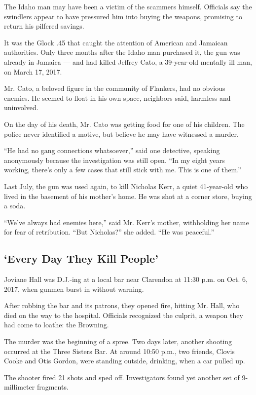 The Idaho man may have been a victim of the scammers himself. Officials
say the swindlers appear to have pressured him into buying the weapons,
promising to return his pilfered savings.

It was the Glock .45 that caught the attention of American and Jamaican
authorities. Only three months after the Idaho man purchased it, the gun
was already in Jamaica --- and had killed Jeffrey Cato, a 39-year-old
mentally ill man, on March 17, 2017.

Mr. Cato, a beloved figure in the community of Flankers, had no obvious
enemies. He seemed to float in his own space, neighbors said, harmless
and uninvolved.

On the day of his death, Mr. Cato was getting food for one of his
children. The police never identified a motive, but believe he may have
witnessed a murder.

``He had no gang connections whatsoever,'' said one detective, speaking
anonymously because the investigation was still open. ``In my eight
years working, there's only a few cases that still stick with me. This
is one of them.''

Last July, the gun was used again, to kill Nicholas Kerr, a quiet
41-year-old who lived in the basement of his mother's home. He was shot
at a corner store, buying a soda.

``We've always had enemies here,'' said Mr. Kerr's mother, withholding
her name for fear of retribution. ``But Nicholas?'' she added. ``He was
peaceful.''

\hypertarget{every-day-they-kill-people}{%
\subsection{`Every Day They Kill
People'}\label{every-day-they-kill-people}}

Joviane Hall was D.J.-ing at a local bar near Clarendon at 11:30 p.m. on
Oct. 6, 2017, when gunmen burst in without warning.

After robbing the bar and its patrons, they opened fire, hitting Mr.
Hall, who died on the way to the hospital. Officials recognized the
culprit, a weapon they had come to loathe: the Browning.

The murder was the beginning of a spree. Two days later, another
shooting occurred at the Three Sisters Bar. At around 10:50 p.m., two
friends, Clovis Cooke and Otis Gordon, were standing outside, drinking,
when a car pulled up.

The shooter fired 21 shots and sped off. Investigators found yet another
set of 9-millimeter fragments.


